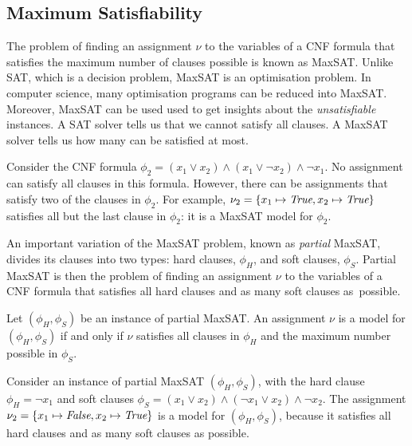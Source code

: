 \subsection{Maximum Satisfiability}
The problem of finding an assignment \(\nu\) to the variables of a CNF formula that satisfies the maximum number of clauses possible is known as \ac{MaxSAT}.
Unlike \ac{SAT}, which is a decision problem, \ac{MaxSAT} is an optimisation problem.
In computer science, many optimisation programs can be reduced into \ac{MaxSAT}. Moreover, \ac{MaxSAT} can be used used to get insights about the \textit{unsatisfiable} instances.
A \ac{SAT} solver tells us that we cannot satisfy all clauses. A \ac{MaxSAT} solver tells us how many can be satisfied at most.

\begin{example}\label{ex:MaxSAT}
Consider the \ac{CNF} formula \(\phi_2 = (x_1 \lor x_2) \land (x_1 \lor \neg x_2) \land \neg x_1\).
No assignment can satisfy all clauses in this formula. 
However, there can be assignments that satisfy two of the clauses in \(\phi_2\).
For example, \(\nu_2 = \{x_1 \mapsto \textit{True}, x_2 \mapsto \textit{True}\}\) satisfies all but the last clause in \(\phi_2\): it is a \ac{MaxSAT} model for \(\phi_2\).
\end{example}

\noindent
An important variation of the \ac{MaxSAT} problem, known as \textit{partial} \ac{MaxSAT}, divides its clauses into two types: hard clauses, \(\phi_H\), and soft clauses, \(\phi_S\).
Partial \ac{MaxSAT} is then the problem of finding an assignment \(\nu\) to the variables of a \ac{CNF} formula that satisfies all hard clauses and as many soft clauses as~possible.

\begin{definition}[Model]
Let \((\phi_H, \phi_S)\) be an instance of partial \ac{MaxSAT}. An assignment \(\nu\) is a model for \((\phi_H, \phi_S)\) if and only if \(\nu\) satisfies all clauses in \(\phi_H\) and the maximum number possible in \(\phi_S\).
\end{definition}

\begin{example}
Consider an instance of partial \ac{MaxSAT} \((\phi_{H}, \phi_{S})\), with the hard clause \(\phi_{H} = \neg x_1\) and soft clauses \(\phi_{S} = (x_1 \lor x_2) \land (\neg x_1 \lor x_2) \land \neg x_2\).
The assignment \(\nu_2 = \{x_1 \mapsto \textit{False}, x_2 \mapsto \textit{True}\}\) is a model for \((\phi_{H}, \phi_{S})\), because it satisfies all hard clauses and as many soft clauses as possible.
\end{example}



